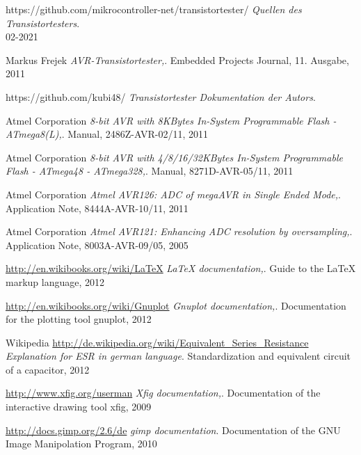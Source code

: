 \documentclass[pdftex,12pt,a4paper,oneside,english]{report}
\begin{document}






 
 
 
 
 
 






\begin{thebibliography}{99}

https://github.com/mikrocontroller-net/transistortester/
\emph{Quellen des Transistortesters}. 
\\ 02-2021

Markus Frejek
\emph{AVR-Transistortester,}.
Embedded Projects Journal,
11. Ausgabe,
2011

https://github.com/kubi48/
\emph{Transistortester Dokumentation der Autors}.

Atmel Corporation
\emph{8-bit AVR with 8KBytes In-System Programmable Flash - ATmega8(L),}.
Manual,
2486Z-AVR-02/11,
2011

Atmel Corporation
\emph{8-bit AVR with 4/8/16/32KBytes In-System Programmable Flash - ATmega48 - ATmega328,}.
Manual,
8271D-AVR-05/11,
2011

Atmel Corporation
\emph{Atmel AVR126: ADC of megaAVR in Single Ended Mode,}.
Application Note,
8444A-AVR-10/11,
2011

Atmel Corporation
\emph{Atmel AVR121: Enhancing ADC resolution by oversampling,}.
Application Note,
8003A-AVR-09/05,
2005

\url{http://en.wikibooks.org/wiki/LaTeX}
\emph{LaTeX documentation,}.
Guide to the LaTeX markup language,
2012

\url{http://en.wikibooks.org/wiki/Gnuplot}
\emph{Gnuplot documentation,}.
Documentation for the plotting tool gnuplot,
2012

Wikipedia
\url{http://de.wikipedia.org/wiki/Equivalent\_Series\_Resistance}
\emph{Explanation for ESR in german language}.
Standardization and equivalent circuit of a capacitor,
2012


\url{http://www.xfig.org/userman}
\emph{Xfig documentation,}.
Documentation of the interactive drawing tool xfig,
2009

\url{http://docs.gimp.org/2.6/de}
\emph{gimp documentation}.
Documentation of the GNU Image Manipolation Program,
2010


\end{thebibliography}
\end{document}
